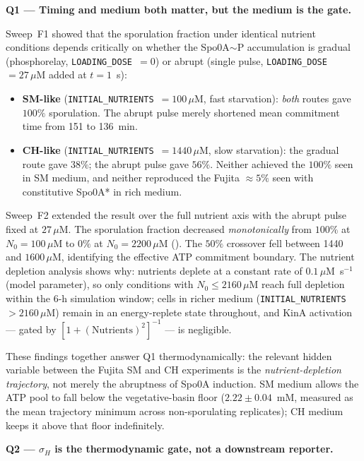 \documentclass[11pt,a4paper]{article}
\begin{document}
\medskip\noindent\textbf{Q1 --- Timing and medium both matter, but the medium is the gate.}

Sweep~F1 showed that the sporulation fraction under identical nutrient
conditions depends critically on whether the Spo0A$\sim$P accumulation
is gradual (phosphorelay, \texttt{LOADING\_DOSE}~$= 0$) or abrupt
(single pulse, \texttt{LOADING\_DOSE}~$= 27\,\mu$M added at $t = 1$~s):
\begin{itemize}
\item \textbf{SM-like} (\texttt{INITIAL\_NUTRIENTS}~$= 100\,\mu$M, fast
  starvation): \emph{both} routes gave $100\%$ sporulation.  The abrupt pulse
  merely shortened mean commitment time from 151 to 136~min.
\item \textbf{CH-like} (\texttt{INITIAL\_NUTRIENTS}~$= 1440\,\mu$M,
  slow starvation): the gradual route gave $38\%$; the abrupt pulse gave
  $56\%$.  Neither achieved the $100\%$ seen in SM medium, and neither
  reproduced the Fujita $\approx5\%$ seen with constitutive Spo0A*
  in rich medium.
\end{itemize}

Sweep~F2 extended the result over the full nutrient axis with the abrupt
pulse fixed at $27\,\mu$M.  The sporulation fraction decreased
\emph{monotonically} from $100\%$ at $N_0 = 100\,\mu$M to $0\%$ at
$N_0 = 2200\,\mu$M ().  The $50\%$ crossover
fell between 1440 and $1600\,\mu$M, identifying the effective ATP
commitment boundary.  The nutrient depletion analysis shows why:
nutrients deplete at a constant rate of $0.1\,\mu$M~s$^{-1}$ (model
parameter), so only conditions with $N_0 \leq 2160\,\mu$M reach full
depletion within the 6-h simulation window; cells in richer medium
(\texttt{INITIAL\_NUTRIENTS}~$> 2160\,\mu$M) remain in an energy-replete
state throughout, and KinA activation --- gated by
$[1 + (\text{Nutrients})^2]^{-1}$ --- is negligible.

These findings together answer Q1 thermodynamically: the relevant
hidden variable between the Fujita SM and CH experiments is the
\emph{nutrient-depletion trajectory}, not merely the abruptness of
Spo0A induction.  SM medium allows the ATP pool to fall below the
vegetative-basin floor ($2.22 \pm 0.04$~mM, measured as the mean
trajectory minimum across non-sporulating replicates); CH medium keeps
it above that floor indefinitely.

\medskip\noindent\textbf{Q2 --- $\sigma_H$ is the thermodynamic gate, not a downstream reporter.}
\end{document}
